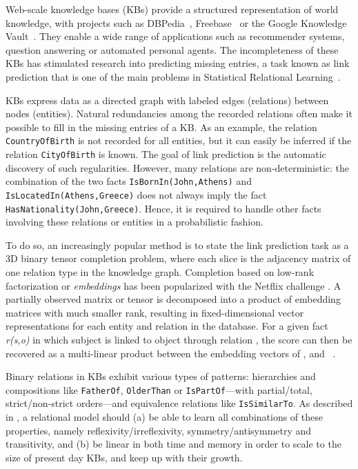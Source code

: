 \documentclass{article}
\def\tt{\texttt}
\begin{document}
Web-scale knowledge bases (KBs) provide a structured representation of world knowledge, with projects such as DBPedia~\cite{dbpedia}, Freebase~\cite{Bollacker2008} or the Google Knowledge Vault~\cite{Dong:2014:KnowledgeVault}. 
They enable a wide range of applications such as recommender systems, question answering or automated personal agents. The incompleteness of these KBs has stimulated \mbox{research} into predicting missing entries, a task known as link prediction that is one of the main problems in Statistical Relational Learning~\citep[SRL,][]{Getoor2007}.







KBs express data as a directed graph with labeled edges (relations) between nodes (entities). Natural redundancies among the recorded relations often make it possible to fill in the missing entries of a KB. 
As an example, the relation \tt{CountryOfBirth} is not recorded for all entities, 
but it can easily be inferred if the relation \tt{CityOfBirth} is known. 
The goal of link prediction is the automatic discovery of such regularities. However, many relations are non-deterministic:  the combination of the two facts \tt{IsBornIn(John,Athens)} and \tt{IsLocatedIn(Athens,Greece)} does not always imply the fact \tt{HasNationality(John,Greece)}. 
Hence, it is required to handle other facts involving these relations or entities in a probabilistic fashion.

To do so, an increasingly popular method is to state the link prediction task as a 3D binary tensor completion problem, where each slice is the adjacency matrix of one relation type in the knowledge graph.
Completion based on low-rank factorization or \emph{embeddings} has been popularized with the Netflix challenge \cite{koren_netflix}. A partially observed matrix or tensor is decomposed into a product of embedding matrices with much smaller rank, resulting in fixed-dimensional vector representations for each entity and relation in the database. 
For a given fact \emph{r(s,o)} in which subject  is linked to object  through relation , the score can then be recovered as a multi-linear product between the embedding vectors of ,  and  ~\cite{nickel_2016_review}.




Binary relations in KBs exhibit various types of patterns: hierarchies and compositions like \tt{FatherOf}, \tt{OlderThan} or \tt{IsPartOf}---with partial/total, strict/non-strict orders---and  equivalence relations like \tt{IsSimilarTo}. As described in \citet{Bordes2013}, a relational model should (a) be able to learn all \mbox{combinations} of these properties, namely reflexivity/irreflexivity, symmetry/antisymmetry and transitivity, and (b) be linear in both time and memory in order to scale to the size of present day KBs, and keep up with their growth. 
\end{document}
